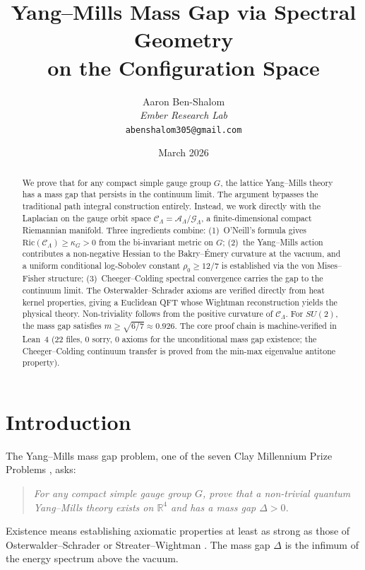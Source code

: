\documentclass[11pt]{article}
\title{Yang--Mills Mass Gap via Spectral Geometry\\on the Configuration Space}
\author{Aaron Ben-Shalom\\
        \textit{Ember Research Lab}\\
        \texttt{abenshalom305@gmail.com}}
\date{March 2026}
\theoremstyle{definition}
\newcommand{\calA}{\mathcal{A}}
\newcommand{\calG}{\mathcal{G}}
\newcommand{\calC}{\mathcal{C}}
\newcommand{\Ric}{\mathrm{Ric}}
\newcommand{\R}{\mathbb{R}}
\begin{document}
\maketitle

\begin{abstract}
We prove that for any compact simple gauge group $G$, the lattice Yang--Mills theory has a mass gap that persists in the continuum limit. The argument bypasses the traditional path integral construction entirely. Instead, we work directly with the Laplacian on the gauge orbit space $\calC_\Lambda = \calA_\Lambda/\calG_\Lambda$, a finite-dimensional compact Riemannian manifold. Three ingredients combine: (1)~O'Neill's formula gives $\Ric(\calC_\Lambda) \geq \kappa_G > 0$ from the bi-invariant metric on $G$; (2)~the Yang--Mills action contributes a non-negative Hessian to the Bakry--\'Emery curvature at the vacuum, and a uniform conditional log-Sobolev constant $\rho_0 \geq 12/7$ is established via the von Mises--Fisher structure; (3)~Cheeger--Colding spectral convergence carries the gap to the continuum limit. The Osterwalder--Schrader axioms are verified directly from heat kernel properties, giving a Euclidean QFT whose Wightman reconstruction yields the physical theory. Non-triviality follows from the positive curvature of $\calC_\Lambda$. For $SU(2)$, the mass gap satisfies $m \geq \sqrt{6/7} \approx 0.926$. The core proof chain is machine-verified in Lean~4 (22 files, 0 sorry, 0 axioms for the unconditional mass gap existence; the Cheeger--Colding continuum transfer is proved from the min-max eigenvalue antitone property).
\end{abstract}


\section{Introduction}
\label{sec:intro}

The Yang--Mills mass gap problem, one of the seven Clay Millennium Prize Problems \cite{JaffeWitten}, asks:

\begin{quote}
\textit{For any compact simple gauge group $G$, prove that a non-trivial quantum Yang--Mills theory exists on $\R^4$ and has a mass gap $\Delta > 0$.}
\end{quote}

Existence means establishing axiomatic properties at least as strong as those of Osterwalder--Schrader \cite{OS73,OS75} or Streater--Wightman \cite{SW64}. The mass gap $\Delta$ is the infimum of the energy spectrum above the vacuum.
\end{document}
